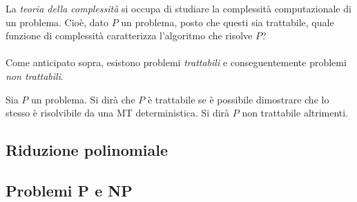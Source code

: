 \documentclass{subfiles}
\begin{document}
La \emph{teoria della complessità} si occupa di studiare la complessità computazionale di un problema.
\noindent Cioè, dato \(P\) un problema, posto che questi sia trattabile, quale funzione di complessità caratterizza l'algoritmo che risolve \(P\)?
\\ \\
Come anticipato sopra, esistono problemi \emph{trattabili} e conseguentemente problemi \emph{non trattabili}.
\begin{Definition*}
    Sia \(P\) un problema. Si dirà che \(P\) è trattabile se è possibile dimostrare che lo stesso è risolvibile da una MT deterministica.
    \noindent Si dirà \(P\) non trattabile altrimenti.
\end{Definition*}

\subsection{Riduzione polinomiale}


\subsection{Problemi P e NP}

\end{document}
